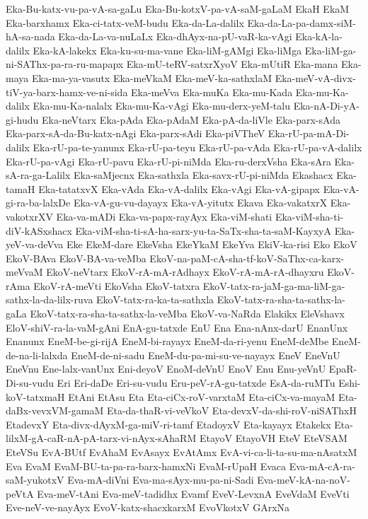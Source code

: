 {Eka-Bu-katx-vu-pa-vA-sa-gaLu
Eka-Bu-kotxV-pa-vA-saM-gaLaM
EkaH
EkaM
Eka-barxhamx
Eka-ci-tatx-veM-budu
Eka-da-La-dalilx
Eka-da-La-pa-damx-siM-hA-sa-nada
Eka-da-La-va-nuLaLx
Eka-dhAyx-na-pU-vaR-ka-vAgi
Eka-kA-la-dalilx
Eka-kA-lakekx
Eka-ku-su-ma-vane
Eka-liM-gAMgi
Eka-liMga
Eka-liM-ga-ni-SAThx-pa-ra-ru-mapapx
Eka-mU-teRV-satxrXyoV
Eka-mUtiR
Eka-mana
Eka-maya
Eka-ma-ya-vasutx
Eka-meVkaM
Eka-meV-ka-sathxlaM
Eka-meV-vA-divx-tiV-ya-barx-hamx-ve-ni-sida
Eka-meVva
Eka-muKa
Eka-mu-Kada
Eka-mu-Ka-dalilx
Eka-mu-Ka-nalalx
Eka-mu-Ka-vAgi
Eka-mu-derx-yeM-talu
Eka-nA-Di-yA-gi-hudu
Eka-neVtarx
Eka-pAda
Eka-pAdaM
Eka-pA-da-liVle
Eka-parx-sAda
Eka-parx-sA-da-Bu-katx-nAgi
Eka-parx-sAdi
Eka-piVTheV
Eka-rU-pa-mA-Di-dalilx
Eka-rU-pa-te-yanunx
Eka-rU-pa-teyu
Eka-rU-pa-vAda
Eka-rU-pa-vA-dalilx
Eka-rU-pa-vAgi
Eka-rU-pavu
Eka-rU-pi-niMda
Eka-ru-derxVsha
Eka-sAra
Eka-sA-ra-ga-Lalilx
Eka-saMjecnx
Eka-sathxla
Eka-savx-rU-pi-niMda
Ekashacx
Eka-tamaH
Eka-tatatxvX
Eka-vAda
Eka-vA-dalilx
Eka-vAgi
Eka-vA-gipapx
Eka-vA-gi-ra-ba-lalxDe
Eka-vA-gu-vu-dayayx
Eka-vA-yitutx
Ekava
Eka-vakatxrX
Eka-vakotxrXV
Eka-va-mADi
Eka-va-papx-rayAyx
Eka-viM-shati
Eka-viM-sha-ti-diV-kASxshacx
Eka-viM-sha-ti-sA-ha-sarx-yu-ta-SaTx-sha-ta-saM-KayxyA
Eka-yeV-va-deVva
Eke
EkeM-dare
EkeVsha
EkeYkaM
EkeYva
EkiV-ka-risi
Eko
EkoV
EkoV-BAva
EkoV-BA-va-veMba
EkoV-na-paM-cA-sha-tf-koV-SaThx-ca-karx-meVvaM
EkoV-neVtarx
EkoV-rA-mA-rAdhayx
EkoV-rA-mA-rA-dhayxru
EkoV-rAma
EkoV-rA-meVti
EkoVsha
EkoV-tatxra
EkoV-tatx-ra-jaM-ga-ma-liM-ga-sathx-la-da-lilx-ruva
EkoV-tatx-ra-ka-ta-sathxla
EkoV-tatx-ra-sha-ta-sathx-la-gaLa
EkoV-tatx-ra-sha-ta-sathx-la-veMba
EkoV-va-NaRda
Elakikx
EleVshavx
EloV-shiV-ra-la-vaM-gAni
EnA-gu-tatxde
EnU
Ena
Ena-nAnx-darU
EnanUnx
Enanunx
EneM-be-gi-rijA
EneM-bi-rayayx
EneM-da-ri-yenu
EneM-deMbe
EneM-de-na-li-lalxda
EneM-de-ni-sadu
EneM-du-pa-mi-su-ve-nayayx
EneV
EneVnU
EneVnu
Ene-lalx-vanUnx
Eni-deyoV
EnoM-deVnU
EnoV
Enu
Enu-yeVnU
EpaR-Di-su-vudu
Eri
Eri-daDe
Eri-su-vudu
Eru-peV-rA-gu-tatxde
EsA-da-ruMTu
Eshi-koV-tatxmaH
EtAni
EtAsu
Eta
Eta-ciCx-roV-varxtaM
Eta-ciCx-va-mayaM
Eta-daBx-vevxVM-gamaM
Eta-da-thaR-vi-veVkoV
Eta-devxV-da-shi-roV-niSAThxH
EtadevxY
Eta-divx-dAyxM-ga-miV-ri-tamf
EtadoyxV
Eta-kayayx
Etakekx
Eta-lilxM-gA-caR-nA-pA-tarx-vi-nAyx-sAhaRM
EtayoV
EtayoVH
EteV
EteVSAM
EteVSu
EvA-BUtf
EvAhaM
EvAsayx
EvAtAmx
EvA-vi-ca-li-ta-su-ma-nAsatxM
Eva
EvaM
EvaM-BU-ta-pa-ra-barx-hamxNi
EvaM-rUpaH
Evaca
Eva-mA-cA-ra-saM-yukotxV
Eva-mA-diVni
Eva-ma-sAyx-mu-pa-ni-Sadi
Eva-meV-kA-na-noV-peVtA
Eva-meV-tAni
Eva-meV-tadidhx
Evamf
EveV-LevxnA
EveVdaM
EveVti
Eve-neV-ve-nayAyx
EvoV-katx-shacxkarxM
EvoVkotxV
GArxNa
}

